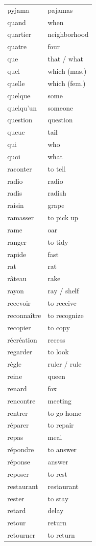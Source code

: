 \documentclass[12pt,a4paper]{article}
\begin{document}
\begin{longtable}{p{4cm} p{6cm}}
pyjama & pajamas \\
quand & when \\
quartier & neighborhood \\
quatre & four \\
que & that / what \\
quel & which (mas.) \\
quelle & which (fem.) \\
quelque & some \\
quelqu'un & someone \\
question & question \\
queue & tail \\
qui & who \\
quoi & what \\
raconter & to tell \\
radio & radio \\
radis & radish \\
raisin & grape \\
ramasser & to pick up \\
rame & oar \\
ranger & to tidy \\
rapide & fast \\
rat & rat \\
râteau & rake \\
rayon & ray / shelf \\
recevoir & to receive \\
reconnaître & to recognize \\
recopier & to copy \\
récréation & recess \\
regarder & to look \\
règle & ruler / rule \\
reine & queen \\
renard & fox \\
rencontre & meeting \\
rentrer & to go home \\
réparer & to repair \\
repas & meal \\
répondre & to answer \\
réponse & answer \\
reposer & to rest \\
restaurant & restaurant \\
rester & to stay \\
retard & delay \\
retour & return \\
retourner & to return \\

\end{longtable}
\end{document}
